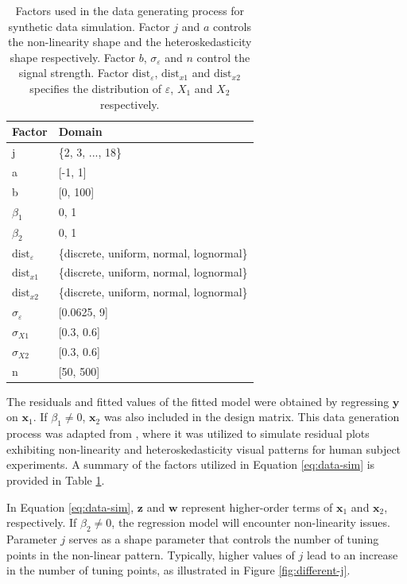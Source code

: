 \documentclass[]{interact}
\theoremstyle{plain}%
\theoremstyle{definition}
\theoremstyle{remark}
\begin{document}
\begin{table}

\caption{\label{tab:factor}Factors used in the data generating process for synthetic data simulation. Factor $j$ and $a$ controls the non-linearity shape and the heteroskedasticity shape respectively. Factor $b$, $\sigma_\varepsilon$ and $n$ control the signal strength. Factor $\text{dist}_\varepsilon$, $\text{dist}_{x1}$ and $\text{dist}_{x2}$ specifies the distribution of $\varepsilon$, $X_1$ and $X_2$ respectively.}
\centering
\begin{tabular}[t]{ll}
\toprule
Factor & Domain\\
\midrule
j & \{2, 3, ..., 18\}\\
a & {}[-1, 1]\\
b & {}[0, 100]\\
$\beta_1$ & {0, 1}\\
$\beta_2$ & {0, 1}\\
\addlinespace
$\text{dist}_\varepsilon$ & \{discrete, uniform, normal, lognormal\}\\
$\text{dist}_{x1}$ & \{discrete, uniform, normal, lognormal\}\\
$\text{dist}_{x2}$ & \{discrete, uniform, normal, lognormal\}\\
$\sigma_{\varepsilon}$ & {}[0.0625, 9]\\
$\sigma_{X1}$ & {}[0.3, 0.6]\\
\addlinespace
$\sigma_{X2}$ & {}[0.3, 0.6]\\
n & {}[50, 500]\\
\bottomrule
\end{tabular}
\end{table}

The residuals and fitted values of the fitted model were obtained by
regressing \(\boldsymbol{y}\) on \(\boldsymbol{x}_1\). If
\(\beta_1 \neq 0\), \(\boldsymbol{x}_2\) was also included in the design
matrix. This data generation process was adapted from
\citet{li2023plot}, where it was utilized to simulate residual plots
exhibiting non-linearity and heteroskedasticity visual patterns for
human subject experiments. A summary of the factors utilized in Equation
\ref{eq:data-sim} is provided in Table \ref{tab:factor}.

In Equation \ref{eq:data-sim}, \(\boldsymbol{z}\) and \(\boldsymbol{w}\)
represent higher-order terms of \(\boldsymbol{x}_1\) and
\(\boldsymbol{x}_2\), respectively. If \(\beta_2 \neq 0\), the
regression model will encounter non-linearity issues. Parameter \(j\)
serves as a shape parameter that controls the number of tuning points in
the non-linear pattern. Typically, higher values of \(j\) lead to an
increase in the number of tuning points, as illustrated in Figure
\ref{fig:different-j}.
\end{document}
